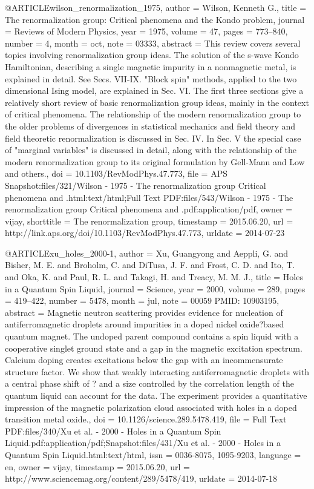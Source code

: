 @ARTICLE{wilson_renormalization_1975,
  author = {Wilson, Kenneth G.},
  title = {The renormalization group: {Critical} phenomena and the {Kondo} problem},
  journal = {Reviews of Modern Physics},
  year = {1975},
  volume = {47},
  pages = {773--840},
  number = {4},
  month = oct,
  note = {03333},
  abstract = {This review covers several topics involving renormalization group
	ideas. The solution of the s-wave Kondo Hamiltonian, describing a
	single magnetic impurity in a nonmagnetic metal, is explained in
	detail. See Secs. VII-IX. "Block spin" methods, applied to the two
	dimensional Ising model, are explained in Sec. VI. The first three
	sections give a relatively short review of basic renormalization
	group ideas, mainly in the context of critical phenomena. The relationship
	of the modern renormalization group to the older problems of divergences
	in statistical mechanics and field theory and field theoretic renormalization
	is discussed in Sec. IV. In Sec. V the special case of "marginal
	variables" is discussed in detail, along with the relationship of
	the modern renormalization group to its original formulation by Gell-Mann
	and Low and others.},
  doi = {10.1103/RevModPhys.47.773},
  file = {APS Snapshot:files/321/Wilson - 1975 - The renormalization group Critical phenomena and .html:text/html;Full Text PDF:files/543/Wilson - 1975 - The renormalization group Critical phenomena and .pdf:application/pdf},
  owner = {vijay},
  shorttitle = {The renormalization group},
  timestamp = {2015.06.20},
  url = {http://link.aps.org/doi/10.1103/RevModPhys.47.773},
  urldate = {2014-07-23}
}

@ARTICLE{xu_holes_2000-1,
  author = {Xu, Guangyong and Aeppli, G. and Bisher, M. E. and Broholm, C. and
	DiTusa, J. F. and Frost, C. D. and Ito, T. and Oka, K. and Paul,
	R. L. and Takagi, H. and Treacy, M. M. J.},
  title = {Holes in a {Quantum} {Spin} {Liquid}},
  journal = {Science},
  year = {2000},
  volume = {289},
  pages = {419--422},
  number = {5478},
  month = jul,
  note = {00059 PMID: 10903195},
  abstract = {Magnetic neutron scattering provides evidence for nucleation of antiferromagnetic
	droplets around impurities in a doped nickel oxide?based quantum
	magnet. The undoped parent compound contains a spin liquid with a
	cooperative singlet ground state and a gap in the magnetic excitation
	spectrum. Calcium doping creates excitations below the gap with an
	incommensurate structure factor. We show that weakly interacting
	antiferromagnetic droplets with a central phase shift of ? and a
	size controlled by the correlation length of the quantum liquid can
	account for the data. The experiment provides a quantitative impression
	of the magnetic polarization cloud associated with holes in a doped
	transition metal oxide.},
  doi = {10.1126/science.289.5478.419},
  file = {Full Text PDF:files/340/Xu et al. - 2000 - Holes in a Quantum Spin Liquid.pdf:application/pdf;Snapshot:files/431/Xu et al. - 2000 - Holes in a Quantum Spin Liquid.html:text/html},
  issn = {0036-8075, 1095-9203},
  language = {en},
  owner = {vijay},
  timestamp = {2015.06.20},
  url = {http://www.sciencemag.org/content/289/5478/419},
  urldate = {2014-07-18}
}

